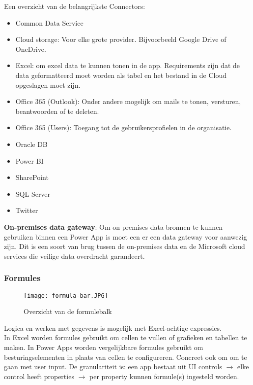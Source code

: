 Een overzicht van de belangrijkste Connectors:
\begin{itemize}
    \item Common Data Service
    \item Cloud storage: Voor elke grote provider. Bijvoorbeeld Google Drive of OneDrive.
    \item Excel: om excel data te kunnen tonen in de app. Requirements zijn dat de data geformatteerd moet worden als tabel en het bestand in de Cloud opgeslagen moet zijn.
    \item Office 365 (Outlook): Onder andere mogelijk om mails te tonen, versturen, beantwoorden of te deleten.
    \item Office 365 (Users): Toegang tot de gebruikersprofielen in de organisatie.
    \item Oracle DB
    \item Power BI
    \item SharePoint
    \item SQL Server
    \item Twitter
\end{itemize} \autocite{MicrosoftDocs2020b}

\textbf{On-premises data gateway}: Om on-premises data bronnen te kunnen gebruiken binnen een Power App is moet een er een data gateway voor aanwezig zijn. Dit is een soort van brug tussen de on-premises data en de Microsoft cloud services die veilige data overdracht garandeert. \autocite{MicrosoftDocs2019b}

\subsubsection{Formules}

\begin{figure}[h!]
    \texttt{[image: formula-bar.JPG]}
    \caption{Overzicht van de formulebalk \autocite{MicrosoftDocs2019c}}
    \label{fig:msformulebalk}
\end{figure}

Logica en werken met gegevens is mogelijk met Excel-achtige expressies.\\
In Excel worden formules gebruikt om cellen te vullen of grafieken en tabellen te maken. In Power Apps worden vergelijkbare formules gebruikt om besturingselementen in plaats van cellen te configureren. Concreet ook om om te gaan met user input. De granulariteit is: een app bestaat uit UI controls $\rightarrow$ elke control heeft properties $\rightarrow$ per property kunnen formule(s) ingesteld worden. \autocite{MicrosoftDocs2019c}

